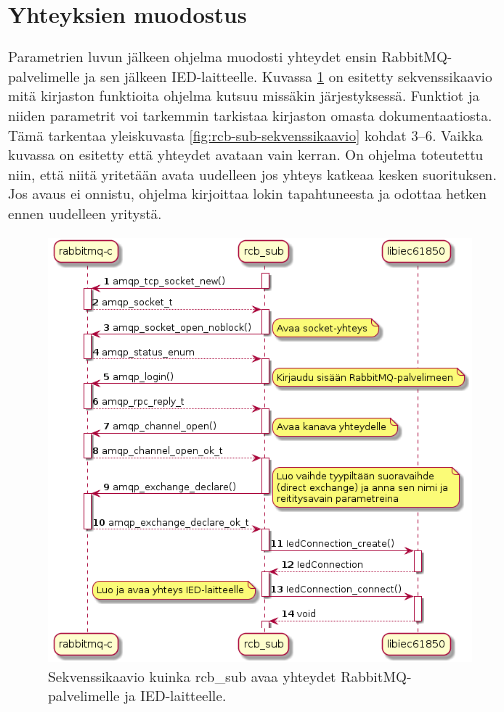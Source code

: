 \subsection{Yhteyksien muodostus}
Parametrien luvun jälkeen ohjelma muodosti yhteydet ensin RabbitMQ-palvelimelle ja sen jälkeen IED-laitteelle. Kuvassa \ref{fig:rcb-sub-open-connections} on esitetty sekvenssikaavio mitä kirjaston funktioita ohjelma kutsuu missäkin järjestyksessä. Funktiot ja niiden parametrit voi tarkemmin tarkistaa kirjaston omasta dokumentaatiosta. Tämä tarkentaa yleiskuvasta \ref{fig:rcb-sub-sekvenssikaavio} kohdat 3--6. Vaikka kuvassa on esitetty että yhteydet avataan vain kerran. On ohjelma toteutettu niin, että niitä yritetään avata uudelleen jos yhteys katkeaa kesken suorituksen. Jos avaus ei onnistu, ohjelma kirjoittaa lokin tapahtuneesta ja odottaa hetken ennen uudelleen yritystä.

\begin{figure}[ht!]
	\includegraphics[width=1\textwidth]{pictures/rcb-sub-open-connections.png}
	\caption{Sekvenssikaavio kuinka rcb\_sub avaa yhteydet RabbitMQ-palvelimelle ja IED-laitteelle.}
	\label{fig:rcb-sub-open-connections}
\end{figure}

